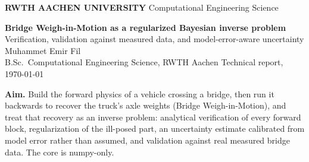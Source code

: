 \documentclass[11pt,a4paper]{article}
\newcommand{\rwthbanner}{%
  \noindent\colorbox{rwthblue}{%
    \parbox{\dimexpr\textwidth-2\fboxsep\relax}{%
      \vspace{2.5pt}%
      {\color{white}\textbf{RWTH AACHEN UNIVERSITY}}\hfill
      {\color{white}\footnotesize Computational Engineering Science}%
      \vspace{2.5pt}}}%
  \vspace{1pt}\par\noindent{\color{rule}\rule{\textwidth}{1.3pt}}%
}
\begin{document}
\rwthbanner
\vspace{0.8em}

{\raggedright
  {\LARGE\bfseries Bridge Weigh-in-Motion as a regularized Bayesian inverse problem}\\[0.35em]
  {\large Verification, validation against measured data, and model-error-aware uncertainty}\\[0.8em]
  {\normalsize Muhammet Emir Fil}\\[0.15em]
  {\small B.Sc.\ Computational Engineering Science, RWTH Aachen \quad\textbullet\quad Technical report, \today}\par
}
\vspace{0.6em}
\noindent{\color{rule}\rule{\textwidth}{0.6pt}}
\vspace{1.0em}

\noindent\colorbox{rwthblue25}{%
  \parbox{\dimexpr\textwidth-2\fboxsep\relax}{%
  \vspace{3pt}\textbf{Aim.} Build the forward physics of a vehicle crossing a bridge, then run
  it backwards to recover the truck's axle weights (Bridge Weigh-in-Motion), and treat that
  recovery as an inverse problem: analytical verification of every
  forward block, regularization of the ill-posed part, an uncertainty estimate calibrated from
  model error rather than assumed, and validation against real measured bridge data. The core is
  numpy-only.\vspace{3pt}}}

\vspace{1.0em}

\begin{abstract}
\noindent
A truck crossing a bridge leaves a measurable trace in the structure's response. Read forwards,
that trace predicts the bridge's vibration; read backwards, it recovers the axle weights. The
second reading is Bridge Weigh-in-Motion (B-WIM), an inverse problem that turns an instrumented
bridge into a traffic-speed scale. This report builds the forward physics (an Euler--Bernoulli
beam under a moving, coupled vehicle load), inverts it for the axle loads, and treats the result
as an inverse problem: verification of every forward block against an analytical
reference, regularization of the ill-conditioned tandem-axle split, an uncertainty estimate that
is shown to be badly over-confident on a dynamic bridge and is then re-calibrated from physics,
and validation against real measured data from the KW51 bridge. The core is numpy-only.
\end{abstract}
\end{document}
